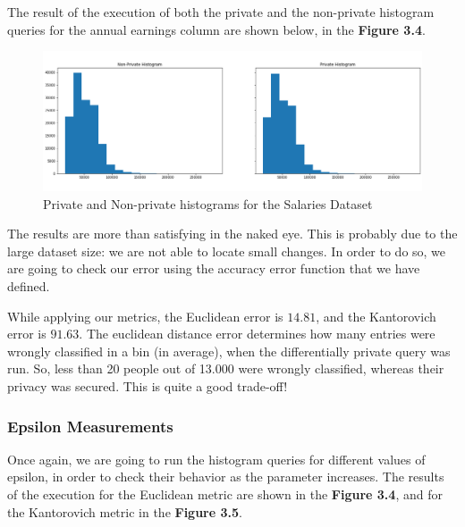 The result of the execution of both the private and the non-private histogram queries for the annual earnings column are shown below, in the \textbf{Figure 3.4}.

\begin{figure}[!htb]\centering
    \includegraphics[width=1\textwidth]{images/simple_hists.png}
    \caption{Private and Non-private histograms for the Salaries Dataset}
\end{figure}

The results are more than satisfying in the naked eye. This is probably due to the large dataset size: we are not able to locate small changes. In order to do so, we are going to check our error using the accuracy error function that we have defined.

While applying our metrics, the Euclidean error is $14.81$, and the Kantorovich error is $91.63$. The euclidean distance error determines how many entries were wrongly classified in a bin (in average), when the differentially private query was run. So, less than 20 people out of 13.000 were wrongly classified, whereas their privacy was secured. This is quite a good trade-off!

\subsubsection{Epsilon Measurements}

Once again, we are going to run the histogram queries for different values of epsilon, in order to check their behavior as the parameter increases. The results of the execution for the Euclidean metric are shown in the \textbf{Figure 3.4}, and for the Kantorovich metric in the \textbf{Figure 3.5}. 


